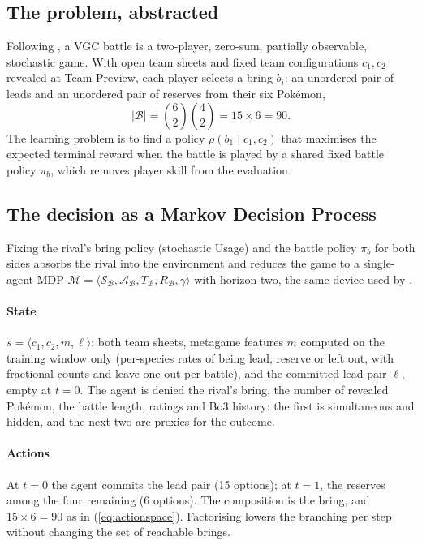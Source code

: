 \documentclass[conference]{IEEEtran}
\begin{document}
\subsection{The problem, abstracted}
Following \cite{angliss2026}, a VGC battle is a two-player, zero-sum, partially observable, stochastic game.
With open team sheets and fixed team configurations $c_1, c_2$ revealed at Team Preview, each player selects a
bring $b_i$: an unordered pair of leads and an unordered pair of reserves from their six Pok\'emon,
\begin{equation}
|\mathcal{B}| = \binom{6}{2}\binom{4}{2} = 15 \times 6 = 90 .
\label{eq:actionspace}
\end{equation}
The learning problem is to find a policy $\rho(b_1 \mid c_1, c_2)$ that maximises the expected terminal reward
when the battle is played by a shared fixed battle policy $\pi_b$, which removes player skill from the evaluation.

\subsection{The decision as a Markov Decision Process}
\label{sec:mdp}
Fixing the rival's bring policy (stochastic Usage) and the battle policy $\pi_b$ for both sides absorbs the
rival into the environment and reduces the game to a single-agent MDP
$\mathcal{M} = \langle \mathcal{S}_{\mathcal{B}}, \mathcal{A}_{\mathcal{B}}, T_{\mathcal{B}}, R_{\mathcal{B}}, \gamma \rangle$
with horizon two, the same device used by \cite{reis2024,reis2025}.

\paragraph{State} $s = \langle c_1, c_2, m, \ell \rangle$: both team sheets, metagame features $m$ computed on
the training window only (per-species rates of being lead, reserve or left out, with fractional counts and
leave-one-out per battle), and the committed lead pair $\ell$, empty at $t=0$. The agent is denied the rival's
bring, the number of revealed Pok\'emon, the battle length, ratings and Bo3 history: the first is simultaneous
and hidden, and the next two are proxies for the outcome.

\paragraph{Actions} At $t=0$ the agent commits the lead pair (15 options); at $t=1$, the reserves among the
four remaining (6 options). The composition is the bring, and $15 \times 6 = 90$ as in (\ref{eq:actionspace}).
Factorising lowers the branching per step without changing the set of reachable brings.
\end{document}
